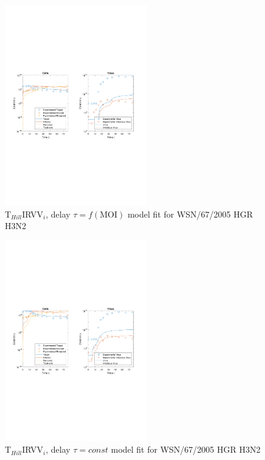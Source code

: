 \begin{figure}[H]
\begin{center}
\includegraphics[width=0.55\textwidth, trim={1cm 9.8cm 1cm 9.5cm}, clip]{D_chapters/6_appendix/4_ValidationH3N2/InfectionDepletionModelTHillIRVViDelayMOI0.002log.pdf}
\caption[T$_{Hill}$IRVV$_i$, delay $\tau = f(\text{MOI})$ model fit for WSN/67/2005 HGR H3N2]%
{T$_{Hill}$IRVV$_i$, delay $\tau = f(\text{MOI})$ model fit for WSN/67/2005 HGR H3N2}
\label{figure:THillIRVViDelayValidationRKI}
\end{center}
\end{figure}

\begin{figure}[H]
\begin{center}
\includegraphics[width=0.55\textwidth, trim={1cm 9.8cm 1cm 9.5cm}, clip]{D_chapters/6_appendix/4_ValidationH3N2/InfectionDepletionModelTHillIRVViDelayFitTauMOI0.002log.pdf}
\caption[T$_{Hill}$IRVV$_i$, delay $\tau = const$ model fit for WSN/67/2005 HGR H3N2]%
{T$_{Hill}$IRVV$_i$, delay $\tau = const$ model fit for WSN/67/2005 HGR H3N2}
\label{figure:THillIRVViDelayFitTauValidationRKI}
\end{center}
\end{figure}